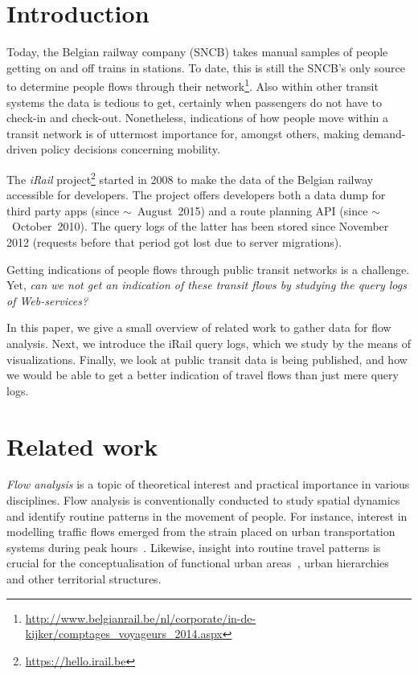 \documentclass{sig-alternate}
\begin{document}
\vspace{1em}

\section{Introduction}
\label{sec:introduction}

Today, the Belgian railway company (SNCB) takes manual samples of people getting on and off trains in stations. 
To date, this is still the SNCB's only source to determine people flows through their network\footnote{\url{http://www.belgianrail.be/nl/corporate/in-de-kijker/comptages_voyageurs_2014.aspx}}.
Also within other transit systems the data is tedious to get, certainly when passengers do not have to check-in and check-out.
Nonetheless, indications of how people move within a transit network is of uttermost importance for, amongst others, making demand-driven policy decisions concerning mobility.

The \emph{iRail} project\footnote{\url{https://hello.irail.be}} started in 2008 to make the data of the Belgian railway accessible for developers.
The project offers developers both a data dump for third party apps (since $\sim$~August~2015) and a route planning API (since $\sim$~October~2010).
The query logs of the latter has been stored since November 2012 (requests before that period got lost due to server migrations).

Getting indications of people flows through public transit networks is a challenge. 
Yet, \emph{can we not get an indication of these transit flows by studying the query logs of Web-services?}

In this paper, we give a small overview of related work to gather data for flow analysis.
Next, we introduce the iRail query logs, which we study by the means of visualizations.
Finally, we look at public transit data is being published, and how we would be able to get a better indication of travel flows than just mere query logs.

\section{Related work}
\label{sec:relwork}

\emph{Flow analysis} is a topic of theoretical interest and practical importance in various disciplines. 
Flow analysis is conventionally conducted to study spatial dynamics and identify routine patterns in the movement of people.
For instance, interest in modelling traffic flows emerged from the strain placed on urban transportation systems during peak hours~\cite{roth,ferreira}.
Likewise, insight into routine travel patterns is crucial for the conceptualisation of functional urban areas~\cite{servillo,sykora}, urban hierarchies~\cite{christaller} and other territorial structures.
\end{document}
